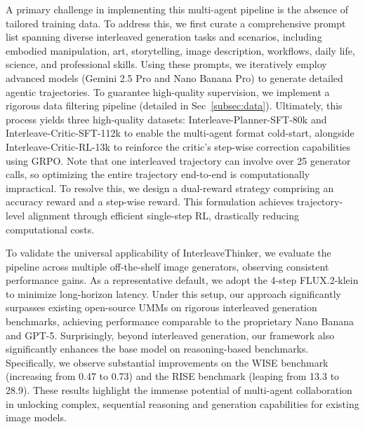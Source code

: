 \documentclass{article} %
\begin{document}
A primary challenge in implementing this multi-agent pipeline is the absence of tailored training data. To address this, we first curate a comprehensive prompt list spanning diverse interleaved generation tasks and scenarios, including embodied manipulation, art, storytelling, image description, workflows, daily life, science, and professional skills. Using these prompts, we iteratively employ advanced models (Gemini 2.5 Pro and Nano Banana Pro) to generate detailed agentic trajectories. To guarantee high-quality supervision, we implement a rigorous data filtering pipeline (detailed in Sec~\ref{subsec:data}). Ultimately, this process yields three high-quality datasets: Interleave-Planner-SFT-80k and Interleave-Critic-SFT-112k to enable the multi-agent format cold-start, alongside Interleave-Critic-RL-13k to reinforce the critic's step-wise correction capabilities using GRPO. Note that one interleaved trajectory can involve over 25 generator calls, so optimizing the entire trajectory end-to-end is computationally impractical. To resolve this, we design a dual-reward strategy comprising an accuracy reward and a step-wise reward. This formulation achieves trajectory-level alignment through efficient single-step RL, drastically reducing computational costs.

To validate the universal applicability of InterleaveThinker, we evaluate the pipeline across multiple off-the-shelf image generators, observing consistent performance gains. As a representative default, we adopt the 4-step FLUX.2-klein to minimize long-horizon latency. Under this setup, our approach significantly surpasses existing open-source UMMs on rigorous interleaved generation benchmarks, achieving performance comparable to the proprietary Nano Banana and GPT-5. Surprisingly, beyond interleaved generation, our framework also significantly enhances the base model on reasoning-based benchmarks. Specifically, we observe substantial improvements on the WISE benchmark (increasing from 0.47 to 0.73) and the RISE benchmark (leaping from 13.3 to 28.9). These results highlight the immense potential of multi-agent collaboration in unlocking complex, sequential reasoning and generation capabilities for existing image models.
\end{document}
